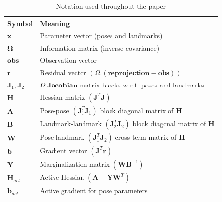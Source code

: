 \begin{table}[b]
  \caption{Notation used throughout the paper}
  \label{tab:overview_notation}
  \centering
  \begin{tabular}{@{}ll@{}}
    \toprule
    Symbol & Meaning \\ \midrule
    $\mathbf{x}$ & Parameter vector (poses and landmarks) \\
    $\boldsymbol{\Omega}$ & Information matrix (inverse covariance) \\
    $\boldsymbol{obs}$ & Observation vector \\
    $\mathbf{r}$ & Residual vector $(\Omega .( \mathbf{reprojection} - \mathbf{obs}))$ \\
    $\mathbf{J}_1, \mathbf{J}_2$ & $\Omega . \mathbf{Jacobian}$ matrix blocks w.r.t. poses and landmarks \\
    $\mathbf{H}$ & Hessian matrix $(\mathbf{J}^T \mathbf{J})$ \\
    $\mathbf{A}$ & Pose-pose $(\mathbf{J}_1^T \mathbf{J}_1)$ block diagonal matrix of $\mathbf{H}$ \\
    $\mathbf{B}$ & Landmark-landmark $(\mathbf{J}_2^T \mathbf{J}_2)$ block diagonal matrix of $\mathbf{H}$ \\
    $\mathbf{W}$ & Pose-landmark $(\mathbf{J}_1^T \mathbf{J}_2)$ cross-term matrix of $\mathbf{H}$ \\
    $\mathbf{b}$ & Gradient vector $(\mathbf{J}^T \mathbf{r})$ \\
    $\mathbf{Y}$ & Marginalization matrix $(\mathbf{W} \mathbf{B}^{-1})$ \\
    $\mathbf{H}_{act}$ & Active Hessian $(\mathbf{A} - \mathbf{Y} \mathbf{W}^T)$ \\
    $\mathbf{b}_{act}$ & Active gradient for pose parameters \\
    \bottomrule
  \end{tabular}
\end{table}
